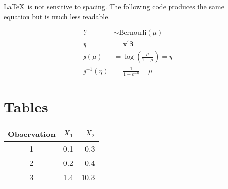 \documentclass[11pt,oneside, letterpaper]{article}
\newcommand{\bbeta}{\boldsymbol{\beta}}
\newcommand{\bx}{\textbf{x}}
\begin{document}
\LaTeX\ is not sensitive to spacing. The following code produces the same equation
but is much less readable.

\begin{align*} Y &\sim \text{Bernoulli}(\mu) \\ \eta &= \bx^\prime\bbeta \\
g(\mu) &= \log \left(\frac{\mu}{1-\mu} \right) = \eta \\
g^{-1}(\eta) &= \frac{1}{1+e^{-\eta}} = \mu \end{align*}

\section{Tables}

\begin{center}
\begin{tabular}{c | r r}
Observation & $X_1$ & $X_2$ \\
\hline
1 & 0.1 & -0.3 \\
2 & 0.2 & -0.4 \\
3 & 1.4 & 10.3 \\
\hline
\end{tabular}
\end{center}
\end{document}
